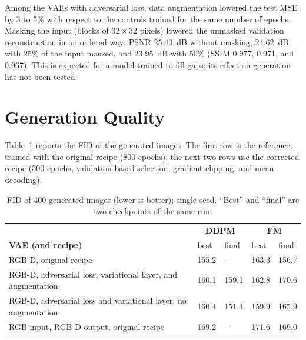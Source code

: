 Among the VAEs with adversarial loss, data augmentation lowered the test MSE by 3 to 5\% with respect to the controls trained for the same number of epochs. Masking the input (blocks of $32\times32$ pixels) lowered the unmasked validation reconstruction in an ordered way: PSNR 25.40~dB without masking, 24.62~dB with 25\% of the input masked, and 23.95~dB with 50\% (SSIM 0.977, 0.971, and 0.967). This is expected for a model trained to fill gaps; its effect on generation has not been tested.

\section{Generation Quality}

Table~\ref{tab:gen} reports the FID of the generated images. The first row is the reference, trained with the original recipe (800 epochs); the next two rows use the corrected recipe (500 epochs, validation-based selection, gradient clipping, and mean decoding).

\begin{table}[H]
\centering
\small
\begin{tabular}{p{}p{}p{}p{}p{}}
\hline
 & \multicolumn{2}{c}{\textbf{DDPM}} & \multicolumn{2}{c}{\textbf{FM}} \\
\textbf{VAE (and recipe)} & best & final & best & final \\
\hline
RGB-D, original recipe & 155.2 & -- & 163.3 & 156.7 \\
RGB-D, adversarial loss, variational layer, and augmentation & 160.1 & 159.1 & 162.8 & 170.6 \\
RGB-D, adversarial loss and variational layer, no augmentation & 160.4 & 151.4 & 159.9 & 165.9 \\
\hline
RGB input, RGB-D output, original recipe & 169.2 & -- & 171.6 & 169.0 \\
\hline
\end{tabular}
\caption{FID of 400 generated images (lower is better); single seed. ``Best'' and ``final'' are two checkpoints of the same run.}
\label{tab:gen}
\end{table}

